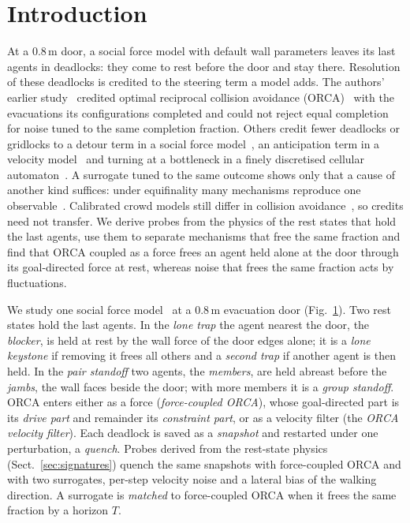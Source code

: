 \section{Introduction}\label{sec:intro}
\begin{figure}[t]
\centering
%
%
\caption{\FigOneCaption}\label{fig:hero}
\end{figure}
%
At a 0.8\,m door, a social force model with default wall parameters leaves its last agents in deadlocks: they come to rest before the door and stay there. Resolution of these deadlocks is credited to the steering term a model adds. The authors' earlier study~\cite{gang2026} credited optimal reciprocal collision avoidance (ORCA)~\cite{vandenberg2011} with the evacuations its configurations completed and could not reject equal completion for noise tuned to the same completion fraction. Others credit fewer deadlocks or gridlocks to a detour term in a social force model~\cite{qu2018}, an anticipation term in a velocity model~\cite{xu2021anticipation} and turning at a bottleneck in a finely discretised cellular automaton~\cite{fu2019}. A surrogate tuned to the same outcome shows only that a cause of another kind suffices: under equifinality many mechanisms reproduce one observable~\cite{beven2006}. Calibrated crowd models still differ in collision avoidance~\cite{wolinski2014parameter}, so credits need not transfer. We derive probes from the physics of the rest states that hold the last agents, use them to separate mechanisms that free the same fraction and find that ORCA coupled as a force frees an agent held alone at the door through its goal-directed force at rest, whereas noise that frees the same fraction acts by fluctuations.

We study one social force model~\cite{helbing1995,helbing2000nature} at a 0.8\,m evacuation door (Fig.~\ref{fig:hero}). Two rest states hold the last agents. In the \emph{lone trap} the agent nearest the door, the \emph{blocker}, is held at rest by the wall force of the door edges alone; it is a \emph{lone keystone} if removing it frees all others and a \emph{second trap} if another agent is then held. In the \emph{pair standoff} two agents, the \emph{members}, are held abreast before the \emph{jambs}, the wall faces beside the door; with more members it is a \emph{group standoff}. ORCA enters either as a force (\emph{force-coupled ORCA}), whose goal-directed part is its \emph{drive part} and remainder its \emph{constraint part}, or as a velocity filter (the \emph{ORCA velocity filter}). Each deadlock is saved as a \emph{snapshot} and restarted under one perturbation, a \emph{quench}. Probes derived from the rest-state physics (Sect.~\ref{sec:signatures}) quench the same snapshots with force-coupled ORCA and with two surrogates, per-step velocity noise and a lateral bias of the walking direction. A surrogate is \emph{matched} to force-coupled ORCA when it frees the same fraction by a horizon $T$.


